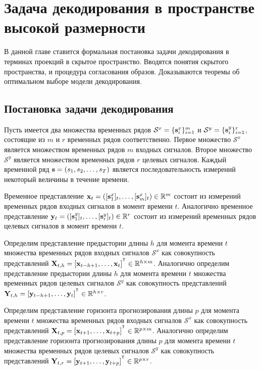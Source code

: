 \chapter{Задача декодирования в пространстве высокой размерности}
\label{chapter2}

В данной главе ставится формальная постановка задачи декодирования в терминах проекций в скрытое пространство. 
Вводятся понятия скрытого пространства, и процедура согласования образов.
Доказываются теоремы об оптимальном выборе модели декодирования.

\section{Постановка задачи декодирования}

\hrulefill

Пусть имеется два множества временных рядов $\mathcal{S}^x = \{\mathbf{s}^x_i\}_{i=1}^m$ и $\mathcal{S}^y = \{\mathbf{s}^y_i\}_{i=1}^r$, состоящие из $m$ и $r$ временных рядов соответственно. 
Первое множество $\mathcal{S}^x$ является множеством временных рядов $m$ входных сигналов. 
Второе множество $\mathcal{S}^y$ является множеством временных рядов $r$ целевых сигналов.
Каждый временной ряд $\mathbf{s} = (s_1, s_2, \dots, s_T)$ является последовательность измерений некоторый величины в течение времени. 
\begin{definition}
	Временное представление $\mathbf{x}_t = ([\mathbf{s}^x_1]_t, \dots, [\mathbf{s}^x_m]_t) \in \mathbb{R}^m$ состоит из измерений временных рядов входных сигналов в момент времени $t$. 
	Аналогично временное представление $\mathbf{y}_t = ([\mathbf{s}^y_1]_t, \dots, [\mathbf{s}^y_r]_t) \in \mathbb{R}^r$ состоит из измерений временных рядов целевых сигналов в момент времени $t$.
\end{definition}
\begin{definition}
	Определим представление предыстории длины $h$ для момента времени $t$ множества временных рядов входных сигналов $\mathcal{S}^x$ как совокупность представлений $\bX_{t,h} = [\bx_{t - h + 1}, \dots, \bx_{t}]^{\T} \in \bbR^{h \times m}$.
	Аналогично определим представление предыстории длины $h$ для момента времени $t$ множества временных рядов целевых сигналов $\mathcal{S}^y$ как совокупность представлений $\bY_{t,h} = [\by_{t - h + 1}, \dots, \by_{t}]^{\T} \in \bbR^{h \times r}$.
\end{definition}
\begin{definition}
	Определим представление горизонта прогнозирования длины $p$ для момента времени $t$ множества временных рядов входных сигналов $\mathcal{S}^x$ как совокупность представлений $\bX_{t,p} = [\bx_{t + 1}, \dots, \bx_{t + p}]^{\T} \in \bbR^{p \times m}$.
	Аналогично определим представление горизонта прогнозирования длины $p$ для момента времени $t$ множества временных рядов целевых сигналов $\mathcal{S}^y$ как совокупность представлений $\bY_{t,r} = [\by_{t + 1}, \dots, \by_{t + p}]^{\T} \in \bbR^{p \times r}$.
\end{definition}

